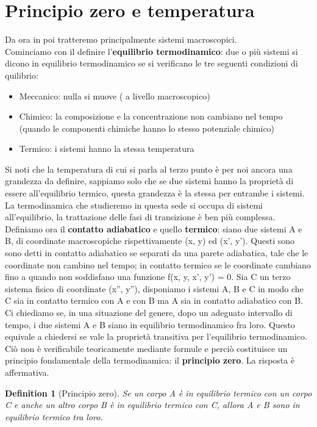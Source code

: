 \documentclass[10pt,a4paper]{article}
\newtheorem{definition}{Definition}
\begin{document}
\section{Principio zero e temperatura}
Da ora in poi tratteremo principalmente sistemi macroscopici.\\
Cominciamo con il definire l'\textbf{equilibrio termodinamico}: due o più sistemi si dicono in equilibrio termodinamico se si verificano le tre seguenti condizioni di quilibrio:
\begin{itemize}
	\item Meccanico: nulla si muove ( a livello macroscopico)
	\item Chimico: la composizione e la concentrazione non cambiano nel tempo (quando le componenti chimiche hanno lo stesso potenziale chimico)
	\item Termico: i sistemi hanno la stessa temperatura
\end{itemize}	
Si noti che la temperatura di cui si parla al terzo punto è per noi ancora una grandezza da definire, sappiamo solo che se due sistemi hanno la proprietà di essere all'equilibrio termico, questa grandezza è la stessa per entrambe i sistemi. La termodinamica che studieremo in questa sede si occupa di sistemi all'equilibrio, la trattazione delle fasi di transizione è ben più complessa.\\
Definiamo ora il \textbf{contatto adiabatico} e quello \textbf{termico}: siano due sistemi A e B, di coordinate macroscopiche rispettivamente (x, y) ed (x', y'). Questi sono sono detti in contatto adiabatico se separati da una parete adiabatica, tale che le coordinate non cambino nel tempo; in contatto termico se le coordinate cambiano fino a quando non soddisfano una funzione f(x, y, x', y') = 0. Sia C un terzo sistema fisico di coordinate (x'', y''), disponiamo i sistemi A, B e C in modo che C sia in contatto termico con A e con B ma A sia in contatto adiabatico con B. Ci chiediamo se, in una situazione del genere, dopo un adeguato intervallo di tempo, i due sistemi A e B siano in equilibrio termodinamico fra loro. Questo equivale a chiedersi se vale la proprietà transitiva per l'equilibrio termodinamico. Ciò non è verificabile teoricamente mediante formule e perciò costituisce un principio fondamentale della termodinamica: il \textbf{principio zero}. La risposta è affermativa.
\begin{definition}[Principio zero]
Se un corpo A è in equilibrio termico con un corpo C e anche un altro corpo B è in equilibrio termico con C, allora A e B sono in equilibrio termico tra loro.
\end{definition}
\end{document}
